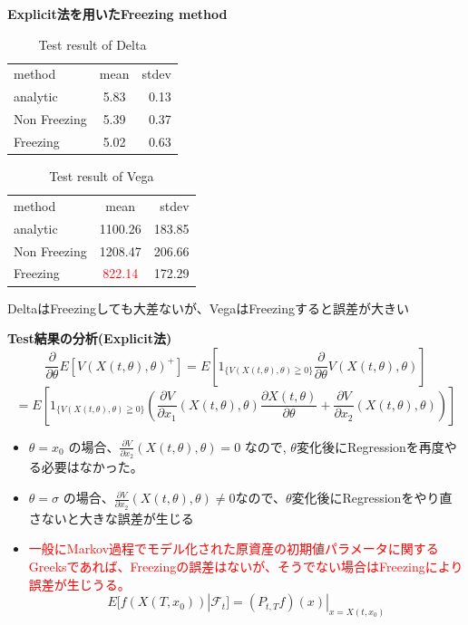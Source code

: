\documentclass[driverfallback=dvipdfmx,cjk]{beamer}
\begin{document}
\begin{frame}\textbf{Explicit法を用いたFreezing method}
    \begin{table}[htb]
        \caption{Test result of Delta}
        \centering
        \begin{tabular}{lcr}
            \hline
            method & mean & stdev \\
            analytic & 5.83& 0.13 \\
            Non Freezing & 5.39 & 0.37\\
            Freezing & 5.02 & 0.63
        \end{tabular}
    \end{table}
    \begin{table}[htb]
        \caption{Test result of Vega}
        \centering
        \begin{tabular}{lcr}
            \hline
            method & mean & stdev \\
            analytic & 1100.26 & 183.85\\
            Non Freezing & 1208.47 & 206.66\\
            Freezing & \textcolor{red}{822.14} & 172.29
        \end{tabular}
    \end{table}
        DeltaはFreezingしても大差ないが、VegaはFreezingすると誤差が大きい
\end{frame}


\begin{frame}\textbf{Test結果の分析(Explicit法)}
    $$ \frac{\partial}{\partial \theta} E[V\left(X(t, \theta ), \theta \right)^+ ] = E[ 1_{\{  V\left(X(t, \theta), \theta\right) \geqq 0 \} }  \frac{\partial}{\partial \theta} V\left(X(t, \theta) , \theta \right)] $$
    $$= E[ 1_{\{  V\left(X(t, \theta), \theta\right) \geqq 0 \} }  \left(\frac{\partial V}{\partial x_1} \left(X(t, \theta) , \theta \right)\frac{\partial X(t, \theta)}{\partial \theta}  + \frac{\partial V}{\partial x_2} \left(X(t, \theta) , \theta \right)\right) ] $$
    \begin{itemize}
        \item $\theta = x_0$ の場合、$\frac{\partial V}{\partial x_2} \left(X(t, \theta) , \theta \right) = 0$ なので, $\theta$変化後にRegressionを再度やる必要はなかった。
        \item $\theta = \sigma$ の場合、$\frac{\partial V}{\partial x_2} \left(X(t, \theta) , \theta \right) \ne 0$なので、$\theta$変化後にRegressionをやり直さないと大きな誤差が生じる
        \item \textcolor{red}{一般にMarkov過程でモデル化された原資産の初期値パラメータに関するGreeksであれば、Freezingの誤差はないが、そうでない場合はFreezingにより誤差が生じうる。}
        $$ E[f(X(T, x_0))|\mathcal{F}_t] = (P_{t,T}f)(x)|_{x = X(t, x_0)}$$
    \end{itemize}
\end{frame}
\end{document}
